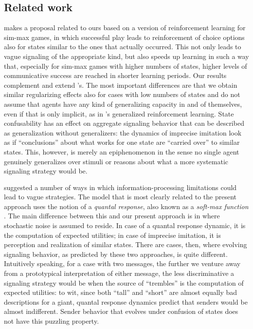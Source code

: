 \documentclass[fleqn,reqno,10pt]{article}
\begin{document}
\subsection{Related work}
\citet{OConnor2013:The-Evolution-o} makes a proposal related to ours based on a version of reinforcement
learning for sim-max games, in which successful play leads to reinforcement of choice options
also for states similar to the ones that actually occurred. This not only leads to vague
signaling of the appropriate kind, but also speeds up learning in such a way that, especially
for sim-max games with higher numbers of states, higher levels of communicative success are
reached in shorter learning periods. Our results complement and extend
\citeauthor{OConnor2013:The-Evolution-o}'s. The most important differences are that we obtain
similar regularizing effects also for cases with low numbers of states and do not assume that
agents have any kind of generalizing capacity in and of themselves, even if that is only
implicit, as in \citeauthor{OConnor2013:The-Evolution-o}'s generalized reinforcement learning.
State confusability has an effect on
aggregate signaling behavior that can be described as generalization without generalizers: the
dynamics of imprecise imitation look as if ``conclusions'' about what works for one state are
``carried over'' to similar states. This, however, is merely an epiphenomenon in the sense no
single agent genuinely generalizes over stimuli or reasons about what a more systematic
signaling strategy would be.


\citet{FrankeJager2010:Vagueness-Signa} suggested a number of ways in which
in\-for\-ma\-tion-processing limitations could lead to vague strategies. The model that is most
clearly related to the present approach uses the notion of a \emph{quantal response}, also
known as a \emph{soft-max function}
\citep[e.g.][]{Luce1959:Individual-Choi,McFadden1976:Quantal-Choice-,GoereeHolt2008:Quantal-Respons}. The
main difference between this and our present approach is in where stochastic noise is assumed
to reside. In case of a quantal response dynamic, it is the computation of expected utilities;
in case of imprecise imitation, it is perception and realization of similar states. There are
cases, then, where evolving signaling behavior, as predicted by these two approaches, is quite
different. Intuitively speaking, for a case with two messages, the further we venture away from
a prototypical interpretation of either message, the less discriminative a signaling strategy
would be when the source of ``trembles'' is the computation of expected utilities: to wit,
since both ``tall'' and ``short'' are almost equally bad descriptions for a giant, quantal
response dynamics predict that senders would be almost indifferent. Sender behavior that
evolves under confusion of states does not have this puzzling property.
\end{document}
